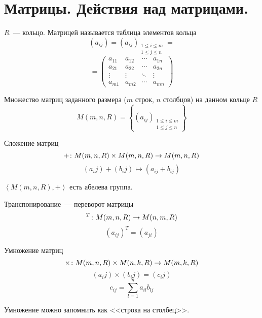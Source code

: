 \section{Матрицы. Действия над матрицами.}

\begin{Def}
$R$~--- кольцо. Матрицей называется таблица элементов кольца
$$(a_{ij}) = (a_{ij})_{\substack{1 \leqslant i \leqslant m \\ 1 \leqslant j \leqslant n}} = $$
$$ = \left(\begin{matrix}
a_{11} & a_{12} & \cdots & a_{1n} \\
a_{21} & a_{22} & \cdots & a_{2n} \\
\vdots & \vdots & \ddots & \vdots \\
a_{m1} & a_{m2} & \cdots & a_{mn}
\end{matrix}\right)$$
\end{Def}

\begin{Def}
Множество матриц заданного размера ($m$ строк, $n$ столбцов) на данном кольце $R$
$$M(m, n, R) = \left\{(a_{ij})_{\substack{1 \leqslant i \leqslant m \\ 1 \leqslant j \leqslant n}}\right\}$$
\end{Def}

\begin{Def}
Сложение матриц
$$+\colon M(m, n, R) \times M(m, n, R) \rightarrow M(m, n, R)$$
$$(a_ij) + (b_ij) \mapsto (a_{ij} + b_{ij})$$
\end{Def}

\begin{lemma}
$\left<M(m, n, R), +\right>$ есть абелева группа.
\end{lemma}

\begin{Def}
Транспонирование~--- переворот матрицы
$${}^T\colon M(m, n, R) \rightarrow M(n, m, R)$$
$$(a_{ij})^T = (a_{ji})$$
\end{Def}

\begin{Def}
Умножение матриц
$$\times\colon M(m, n, R) \times M(n, k, R) \rightarrow M(m, k, R)$$
$$(a_ij) \times (b_ij) = (c_ij)$$
$$c_{ij} = \sum_{l=1}^{n} a_{il}b_{lj}$$
\end{Def}

Умножение можно запомнить как <<строка на столбец>>.

